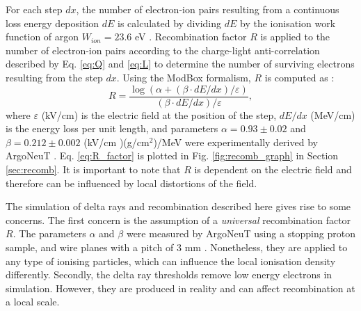 For each step $dx$, the number of electron-ion pairs resulting from a continuous loss energy deposition $dE$ is calculated by dividing $dE$ by the ionisation work function of argon $W_{ion} = 23.6$ eV \cite{wion_lar}.
Recombination factor $R$ is applied to the number of electron-ion pairs according to the charge-light anti-correlation described by Eq. \ref{eq:Q} and \ref{eq:L} to determine the number of surviving electrons resulting from the step $dx$.    
Using the ModBox formalism, $R$ is computed as \cite{argoneut_recomb}:
\begin{equation}
        \label{eq:R_factor}
        R = \frac{\log{ \left( \alpha + \left(\beta \cdot dE/dx\right)/\varepsilon \right)}}{\left(\beta \cdot dE/dx\right)/\varepsilon},
\end{equation}
where $\varepsilon$ (kV/cm) is the electric field at the position of the step, $dE/dx$ (MeV/cm) is the energy loss per unit length, and parameters $\alpha = 0.93\pm0.02$ and $\beta = 0.212\pm0.002$ (kV/cm
)(g/cm$^{2}$)/MeV were experimentally derived by ArgoNeuT \cite{argoneut_recomb}.
Eq. \ref{eq:R_factor} is plotted in Fig. \ref{fig:recomb_graph} in Section \ref{sec:recomb}.
It is important to note that $R$ is dependent on the electric field and therefore can be influenced by local distortions of the field.

The simulation of delta rays and recombination described here gives rise to some concerns.
The first concern is the assumption of a \textit{universal} recombination factor $R$.
The parameters $\alpha$ and $\beta$ were measured by ArgoNeuT using a stopping proton sample, and wire planes with a pitch of 3 mm \cite{argoneut_recomb}.
Nonetheless, they are applied to any type of ionising particles, which can influence the local ionisation density differently. 
Secondly, the delta ray thresholds remove low energy electrons in simulation.
However, they are produced in reality and can affect recombination at a local scale. 

